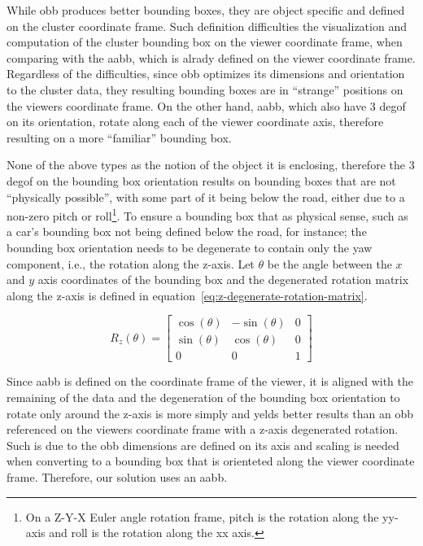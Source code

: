 While \ac{obb} produces better bounding boxes, they are object specific and defined on the cluster coordinate frame. Such definition difficulties the visualization and computation of the cluster bounding box on the viewer coordinate frame, when comparing with the \ac{aabb}, which is alrady defined on the viewer coordinate frame.  Regardless of the difficulties, since \ac{obb} optimizes its dimensions and orientation to the cluster data, they resulting bounding boxes are in ``strange'' positions on the viewers coordinate frame. On the other hand, \ac{aabb}, which also have 3 \ac{degof} on its orientation, rotate along each of the viewer coordinate axis, therefore resulting on a more ``familiar'' bounding box.

None of the above types as the notion of the object it is enclosing, therefore the 3 \ac{degof} on the bounding box orientation results on bounding boxes that are not ``physically possible'', with some part of it being below the road, either due to a non-zero pitch or roll\footnote{On a Z-Y-X Euler angle rotation frame, pitch is the rotation along the yy-axis and roll is the rotation along the xx axis.}. To ensure a bounding box that as physical sense, such as a car's bounding box not being defined below the road, for instance; the bounding box orientation needs to be degenerate to contain only the yaw component, i.e., the rotation along the z-axis. Let $\theta$ be the angle between the $x$ and $y$ axis coordinates of the bounding box and the degenerated rotation matrix along the z-axis is defined in equation~\ref{eq:z-degenerate-rotation-matrix}.

\begin{equation}
	\label{eq:z-degenerate-rotation-matrix}
	R_z(\theta) = 
	\begin{bmatrix}
		\cos(\theta) & -\sin(\theta) & 0 \\
		\sin(\theta) & \cos(\theta) & 0 \\
		0 & 0 & 1
	\end{bmatrix}
\end{equation}

Since \ac{aabb} is defined on the coordinate frame of the viewer, it is aligned with the remaining of the data and the degeneration of the bounding box orientation to rotate only around the z-axis is more simply and yelds better results than an \ac{obb} referenced on the viewers coordinate frame with a z-axis degenerated rotation. Such is due to the \ac{obb} dimensions are defined on its axis and scaling is needed when converting to a bounding box that is orienteted along the viewer coordinate frame. Therefore, our solution uses an \acf{aabb}.

